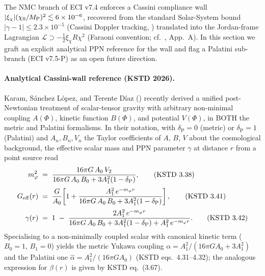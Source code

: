 The NMC branch of ECI v7.4 enforces a Cassini compliance wall
$|\xi_\chi|(\chi_0/M_{\rm P})^2 \lesssim 6\times 10^{-6}$, recovered from
the standard Solar-System bound $|\gamma-1|\le 2.3\times 10^{-5}$
(Cassini Doppler tracking, \cite{Bertotti03}) translated into the
Jordan-frame Lagrangian $\mathcal{L}\supset -\tfrac{1}{2}\xi_\chi R\chi^2$
(Faraoni convention; cf.\ \cite{Wolf25}, App.~A).  In this section we
graft an explicit analytical PPN reference for the wall and
flag a Palatini sub-branch (ECI v7.5-P) as an open future direction.

\paragraph{Analytical Cassini-wall reference (KSTD 2026).}
Karam, S\'anchez L\'opez, and Terente D\'iaz \cite{KSTD26}
() recently derived a unified post-Newtonian
treatment of scalar-tensor gravity with arbitrary non-minimal
coupling $A(\Phi)$, kinetic function $B(\Phi)$, and potential
$V(\Phi)$, in BOTH the metric and Palatini formalisms.  In their
notation, with $\delta_{\mathrm P}=0$ (metric) or $\delta_{\mathrm P}=1$
(Palatini) and $A_n,B_n,V_n$ the Taylor coefficients of $A$, $B$, $V$
about the cosmological background, the effective scalar mass and
PPN parameter $\gamma$ at distance $r$ from a point source read
\begin{align}
   m_\varphi^2 &\;=\; \frac{16\pi G\,A_0\,V_2}
                      {16\pi G\,A_0\,B_0 + 3A_1^2(1-\delta_{\mathrm P})} ,
   \tag{KSTD~3.38}\\[2pt]
   G_{\rm eff}(r) &\;=\; \frac{G}{A_0}\!
     \left[1 + \frac{A_1^2\,e^{-m_\varphi r}}
                    {16\pi G\,A_0\,B_0 + 3A_1^2(1-\delta_{\mathrm P})}\right] ,
   \tag{KSTD~3.41}\\[2pt]
   \gamma(r) &\;=\; 1 \;-\; \frac{2A_1^2\,e^{-m_\varphi r}}
        {16\pi G\,A_0\,B_0 + 3A_1^2(1-\delta_{\mathrm P}) + A_1^2\,e^{-m_\varphi r}} .
   \tag{KSTD~3.42}
\end{align}
Specialising to a non-minimally coupled scalar with canonical
kinetic term ($B_0=1$, $B_1=0$) yields the metric Yukawa coupling
$\alpha = A_1^2/(16\pi G A_0 + 3A_1^2)$ and the Palatini one
$\hat\alpha = A_1^2/(16\pi G A_0)$ (KSTD eqs.~4.31--4.32);
the analogous expression for $\beta(r)$ is given by KSTD eq.~(3.67).

